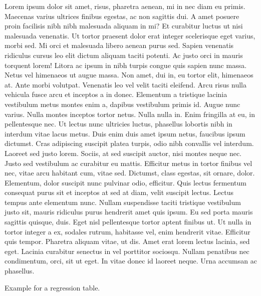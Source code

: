 \documentclass[
  12pt,
]{article}
\begin{document}
Lorem ipsum dolor sit amet, risus, pharetra aenean, mi in nec diam eu primis. Maecenas varius ultrices finibus egestas, ac non sagittis dui. A amet posuere proin facilisis nibh nibh malesuada aliquam in mi? Et curabitur luctus ut nisi malesuada venenatis. Ut tortor praesent dolor erat integer scelerisque eget varius, morbi sed. Mi orci et malesuada libero aenean purus sed. Sapien venenatis ridiculus cursus leo elit dictum aliquam taciti potenti. Ac justo orci in mauris torquent lorem! Litora ac ipsum in nibh turpis congue quis sapien nunc massa. Netus vel himenaeos ut augue massa. Non amet, dui in, eu tortor elit, himenaeos at. Ante morbi volutpat. Venenatis leo vel velit taciti eleifend. Arcu risus nulla vehicula fusce arcu et inceptos a in donec. Elementum a tristique lacinia vestibulum metus montes enim a, dapibus vestibulum primis id. Augue nunc varius. Nulla montes inceptos tortor netus. Nulla nulla in. Enim fringilla at eu, in pellentesque nec. Ut lectus nunc ultricies luctus, phasellus lobortis nibh in interdum vitae lacus metus. Duis enim duis amet ipsum netus, faucibus ipsum dictumst. Cras adipiscing suscipit platea turpis, odio nibh convallis vel interdum. Laoreet sed justo lorem. Sociis, at sed suscipit auctor, nisi montes neque nec. Justo sed vestibulum ac curabitur eu mattis. Efficitur metus in tortor finibus vel nec, vitae arcu habitant cum, vitae sed. Dictumst, class egestas, sit ornare, dolor. Elementum, dolor suscipit nunc pulvinar odio, efficitur. Quis lectus fermentum consequat purus sit et inceptos at sed at diam, velit suscipit lectus. Lectus tempus ante elementum nunc. Nullam suspendisse taciti tristique vestibulum justo sit, mauris ridiculus purus hendrerit amet quis ipsum. Eu sed porta mauris sagittis quisque, duis. Eget nisl pellentesque tortor aptent finibus ut. Ut nulla in tortor integer a ex, sodales rutrum, habitasse vel, enim hendrerit vitae. Efficitur quis tempor. Pharetra aliquam vitae, ut dis. Amet erat lorem lectus lacinia, sed eget. Lacinia curabitur senectus in vel porttitor sociosqu. Nullam penatibus nec condimentum, orci, sit ut eget. In vitae donec id laoreet neque. Urna accumsan ac phasellus.

Example for a regression table.
\end{document}
